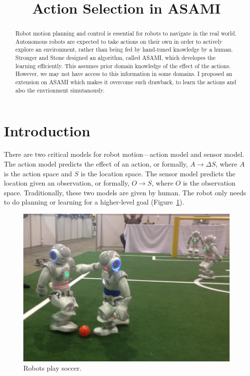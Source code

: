 \documentclass[10pt]{article}
\title{Action Selection in ASAMI}
\date{}
\begin{document}
\maketitle

\begin{abstract}
Robot motion planning and control is essential for robots to navigate
in the real world.
Autonomous robots are expected to take actions on their own in order to actively explore an
environment, rather than being fed by hand-tuned knowledge by a human.
Stronger and Stone designed an algorithm, called ASAMI, which
developes the learning efficiently. This assumes prior domain
knowledge of the effect of the actions. However, we may not have
access to this information in some domains. I proposed an extension on
ASAMI which makes it overcome such drawback, to learn the actions and
also the envrionment simutanously.
\end{abstract}

\section{Introduction}

There are two critical models for robot motion---action model and
sensor model. The action model predicts the effect of an action,
or formally, $A \rightarrow \Delta S$, where $A$ is the action space
and $S$ is the location space. The sensor model predicts the
location given an observation, or formally, $O \rightarrow S$, where
$O$ is the observation space. Traditionally, these two models are
given by human. The robot only needs to do planning or learning for a
higher-level goal (Figure~\ref{fig:robocup}).

\begin{figure}
\centering
\includegraphics[width=0.7\columnwidth]{Robocup.png}
\caption{Robots play soccer. \cite{LNAI12-Barrett}}
\label{fig:robocup}
\end{figure}
\end{document}
